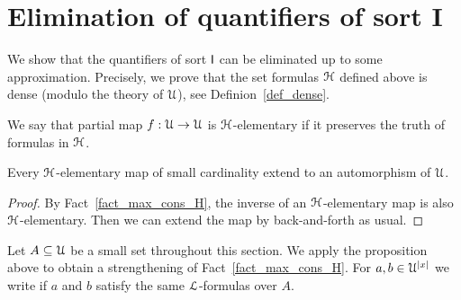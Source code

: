 \documentclass[10pt,oneside]{amsproc}
\renewcommand*{\emph}[1]{%
   \smash{\tikz[baseline]\node[rectangle, fill=teal!25, rounded corners, inner xsep=0.5ex, inner ysep=0.2ex, anchor=base, minimum height = 2.7ex]{\strut #1};}}
\begin{document}








\section{Elimination of quantifiers of sort \textsf{I}}\label{Ielimination}

We show that the quantifiers of sort ${\sf I}$ can be eliminated up to some approximation.
Precisely, we prove that the set formulas ${\EuScript H}$ defined above is dense (modulo the theory of ${\EuScript U}$), see Definion~\ref{def_dense}.

We say that partial map $f:{\EuScript U}\to{\EuScript U}$ is ${\EuScript H}$-elementary if it preserves the truth of formulas in ${\EuScript H}$.

\begin{proposition}
  Every ${\EuScript H}$-elementary map of small cardinality extend to an automorphism of ${\EuScript U}$.
\end{proposition}

\begin{proof}
  By Fact~\ref{fact_max_cons_H}, the inverse of an ${\EuScript H}$-elementary map is also ${\EuScript H}$-elementary.
  Then we can extend the map by back-and-forth as usual.
\end{proof}

Let $A\subseteq{\EuScript U}$ be a small set throughout this section.
We apply the proposition above to obtain a strengthening of Fact~\ref{fact_max_cons_H}.
For $a,b\in {\EuScript U}^{|x|}$ we write \emph{$a\equiv_Ab$\/} if $a$ and $b$ satisfy the same ${\EuScript L}$-formulas over $A$.
\end{document}
